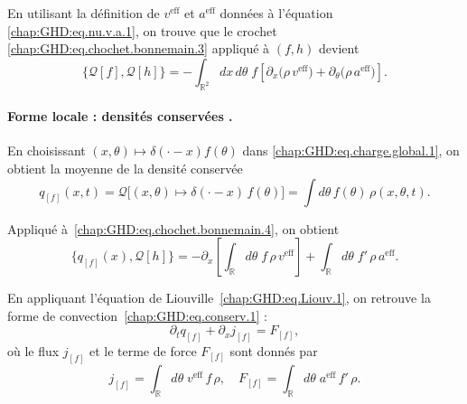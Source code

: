 En utilisant la définition de $v^{\mathrm{eff}}$ et $a^{\mathrm{eff}}$ données à l'équation \eqref{chap:GHD:eq.nu.v.a.1}, on trouve que le crochet \eqref{chap:GHD:eq.chochet.bonnemain.3} appliqué à $(f,h)$ devient 
\begin{equation}\label{chap:GHD:eq.chochet.bonnemain.4}
	\{\mathcal{Q}[f], \mathcal{Q}[h]\} 
	= - \int_{\mathbb{R}^2} dx\, d\theta \; f \left[ \partial_x \big( \rho \, v^{\mathrm{eff}} \big) 
	+ \partial_\theta \big( \rho \, a^{\mathrm{eff}} \big) \right].
\end{equation}

\paragraph{Forme locale : densités conservées .} 
En choisissant $(x,\theta) \mapsto \delta(\cdot - x)f(\theta)$ dans \eqref{chap:GHD:eq.charge.global.1}, on obtient la moyenne de la densité conservée \ie
\begin{equation}\label{chap:GHD:eq.chochet.bonnemain.4.11}
	q_{[f]}(x,t) = \mathcal{Q} \big[ (x,\theta) \mapsto \delta(\cdot - x) \, f(\theta) \big] =\int d\theta\, f(\theta)\,\rho(x,\theta,t).
\end{equation}

Appliqué à~\eqref{chap:GHD:eq.chochet.bonnemain.4}, on obtient
\begin{equation}\label{chap:GHD:eq.chochet.bonnemain.5}
	\{q_{[f]}(x), \mathcal{Q}[h]\} 
	= - \partial_x \left[ \int_{\mathbb{R}} d\theta \; f \, \rho \, v^{\mathrm{eff}} \right]
	+ \int_{\mathbb{R}} d\theta \; f' \, \rho \, a^{\mathrm{eff}}.
\end{equation}

En appliquant l’équation de Liouville~\eqref{chap:GHD:eq.Liouv.1}, on retrouve la forme de convection~\eqref{chap:GHD:eq.conserv.1} :
\begin{equation}\label{chap:GHD:eq.conserv.2}
	\partial_t q_{[f]} + \partial_x j_{[f]} = F_{[f]},
\end{equation}
où le flux $j_{[f]}$ et le terme de force $F_{[f]}$ sont donnés par
\begin{equation}\label{chap:GHD:eq.conserv.2.1}
	j_{[f]} = \int_{\mathbb{R}} d\theta \; v^{\mathrm{eff}} \, f \, \rho,
	\quad F_{[f]} = \int_{\mathbb{R}} d\theta \; a^{\mathrm{eff}} \, f' \, \rho.
\end{equation}

